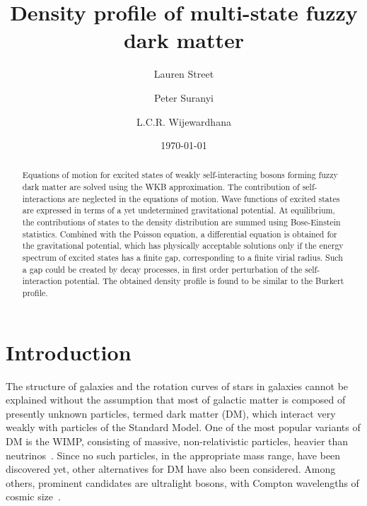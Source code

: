 \documentclass[aps,prl,twocolumn]{revtex4}
\begin{document}
\title{Density profile of multi-state fuzzy dark matter}%

\author{Lauren Street}

\author{Peter Suranyi}

\author{L.C.R. Wijewardhana}




\date{\today}%

\begin{abstract}
Equations of motion for excited states of weakly self-interacting bosons forming fuzzy dark matter are solved using the WKB approximation. The contribution of self-interactions are neglected in the equations of motion. Wave functions of excited states are expressed in terms of a yet undetermined gravitational potential. At equilibrium, the contributions of states to the density distribution are summed using Bose-Einstein statistics. Combined with the Poisson equation, a differential equation is obtained for the gravitational potential, which has physically acceptable solutions only if the energy spectrum of excited states has a finite gap, corresponding to a finite virial radius. Such a gap could be created by decay processes, in first order perturbation of the self-interaction potential.  The obtained  density profile is found to be similar to the Burkert profile.
\end{abstract}


\maketitle


\section{Introduction}
\noindent The structure of galaxies and the rotation curves of stars in galaxies cannot be explained without the assumption that most of galactic matter is composed of presently unknown particles, termed dark matter (DM), which interact very weakly with particles of the Standard Model.  One of the most popular variants of DM is the WIMP, consisting of massive, non-relativistic particles, heavier than neutrinos~\cite{Peebles,Bond,Blumenthal}. Since no such particles, in the appropriate mass range, have been discovered yet, other alternatives for DM have also been considered. Among others, prominent candidates are ultralight bosons, with Compton wavelengths of cosmic size~\cite{Ruffini,Sin,Hu,BH,Hui}.
\end{document}
